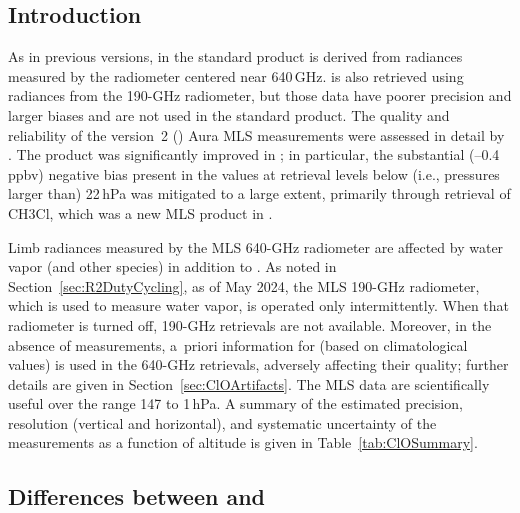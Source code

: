 
\subsection{Introduction}

As in previous versions, in \thisv the standard  product is derived from radiances measured by the radiometer centered near 640\,GHz.  is also retrieved using radiances from the \mbox{190\nobreakdash-GHz} radiometer, but those data have poorer precision and larger biases and are not used in the standard  product. The quality and reliability of the version~2 (\vii) Aura MLS  measurements were assessed in detail by \citet{SanteeEtal:2008:ClO}. The  product was significantly improved in \viii \citep{EOSMLSV33V34Quality}; in particular, the substantial (--0.4\,ppbv) negative bias present in the \vii {} values at retrieval levels below (i.e., pressures larger than) 22\,hPa was mitigated to a large extent, primarily through retrieval of CH\cs3Cl, which was a new MLS product in \viii. 

Limb radiances measured by the MLS \mbox{640-GHz} radiometer are affected by water vapor (and other species) in addition to \@. As noted in Section~\ref{sec:R2DutyCycling}, as of May 2024, the MLS \mbox{190-GHz} radiometer, which is used to measure water vapor, is operated only intermittently. When that radiometer is turned off, \mbox{190-GHz}  retrievals are not available. Moreover, in the absence of  measurements, a~priori information for  (based on climatological values) is used in the \mbox{640-GHz}  retrievals, adversely affecting their quality; further details are given in Section~\ref{sec:ClOArtifacts}. The MLS \thisv {} data are scientifically useful over the range 147 to 1\,hPa. A summary of the estimated precision, resolution (vertical and horizontal), and systematic uncertainty of the \thisv {} measurements as a function of altitude is given in Table~\ref{tab:ClOSummary}.

\subsection{Differences between \prevv and \thisv}
\label{sec:clov5v6Diffs}


